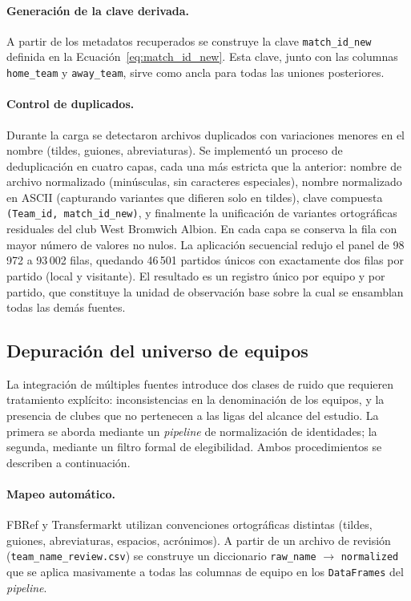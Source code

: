 \paragraph{Generaci\'on de la clave derivada.} A partir de los metadatos recuperados se construye la clave \texttt{match\_id\_new} definida en la Ecuaci\'on~\ref{eq:match_id_new}. Esta clave, junto con las columnas \texttt{home\_team} y \texttt{away\_team}, sirve como ancla para todas las uniones posteriores.

\paragraph{Control de duplicados.} Durante la carga se detectaron archivos duplicados con variaciones menores en el nombre (tildes, guiones, abreviaturas). Se implement\'o un proceso de deduplicaci\'on en cuatro capas, cada una m\'as estricta que la anterior: nombre de archivo normalizado (min\'usculas, sin caracteres especiales), nombre normalizado en ASCII (capturando variantes que difieren solo en tildes), clave compuesta \texttt{(Team\_id, match\_id\_new)}, y finalmente la unificaci\'on de variantes ortogr\'aficas residuales del club West Bromwich Albion. En cada capa se conserva la fila con mayor n\'umero de valores no nulos. La aplicaci\'on secuencial redujo el panel de 98\,972 a 93\,002 filas, quedando 46\,501 partidos \'unicos con exactamente dos filas por partido (local y visitante). El resultado es un registro \'unico por equipo y por partido, que constituye la unidad de observaci\'on base sobre la cual se ensamblan todas las dem\'as fuentes.

\subsection{Depuraci\'on del universo de equipos}
\label{subsec:normalizacion}
\label{subsec:purga_elite}

La integraci\'on de m\'ultiples fuentes introduce dos clases de ruido que requieren tratamiento expl\'icito: inconsistencias en la denominaci\'on de los equipos, y la presencia de clubes que no pertenecen a las ligas del alcance del estudio. La primera se aborda mediante un \textit{pipeline} de normalizaci\'on de identidades; la segunda, mediante un filtro formal de elegibilidad. Ambos procedimientos se describen a continuaci\'on.

\paragraph{Mapeo autom\'atico.} FBRef y Transfermarkt utilizan convenciones ortogr\'aficas distintas (tildes, guiones, abreviaturas, espacios, acr\'onimos). A partir de un archivo de revisi\'on \\
(\texttt{team\_name\_review.csv}) se construye un diccionario \texttt{raw\_name} $\rightarrow$ \texttt{normalized} que se aplica masivamente a todas las columnas de equipo en los \texttt{DataFrames} del \textit{pipeline}.

